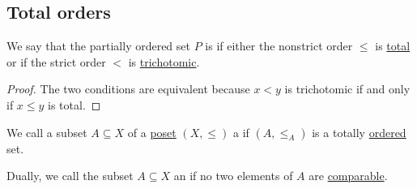 \subsection{Total orders}\label{subsec:total_orders}

\begin{definition}\label{def:totally_ordered_set}
  We say that the partially ordered set \( P \) is  if either the nonstrict order \( \leq \) is \hyperref[def:binary_relation/total]{total} or if the strict order \( < \) is \hyperref[def:binary_relation/trichotomic]{trichotomic}.
\end{definition}
\begin{proof}
  The two conditions are equivalent because \( x < y \) is trichotomic if and only if \( x \leq y \) is total.
\end{proof}

\begin{definition}\label{def:poset_chain}
  We call a subset \( A \subseteq X \) of a \hyperref[def:poset]{poset} \( (X, \leq) \) a  if \( (A, \leq_A) \) is a totally \hyperref[def:totally_ordered_set]{ordered} set.

  Dually, we call the subset \( A \subseteq X \) an  if no two elements of \( A \) are \hyperref[def:preordered_set/comparability]{comparable}.
\end{definition}

